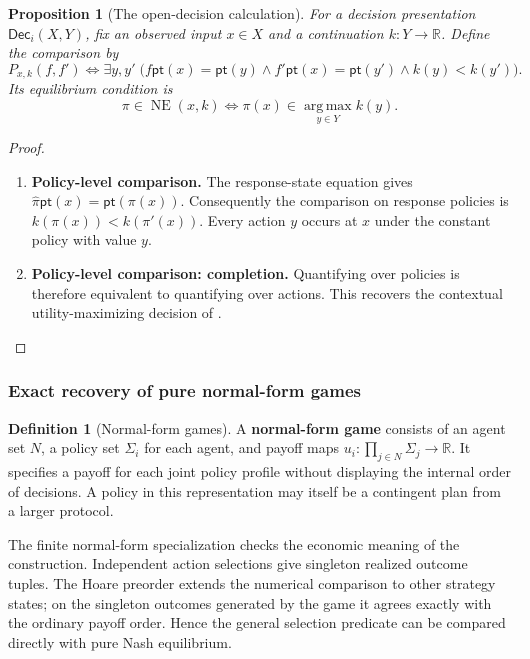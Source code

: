 \documentclass[11pt,a4paper]{article}
\numberwithin{equation}{section}
\newtheorem{proposition}[theorem]{Proposition}
\theoremstyle{definition}
\newtheorem{definition}[theorem]{Definition}
\theoremstyle{remark}
\theoremstyle{plain}
\begin{document}
\begin{proposition}[The open-decision calculation]
\label{prop:egt-open-decision}
For a decision presentation $\mathsf{Dec}_i(X,Y)$, fix an observed
input $x\in X$ and a continuation $k:Y\to\mathbb R$. Define
the comparison by
\[
 P_{x,k}(f,f')\iff\exists y,y'\;
 \bigl(f\mathsf{pt}(x)=\mathsf{pt}(y)\wedge
 f'\mathsf{pt}(x)=\mathsf{pt}(y')\wedge k(y)<k(y')\bigr).
\]
Its equilibrium condition is
\[
 \pi\in\operatorname{NE}(x,k)
 \iff\pi(x)\in\operatorname*{arg\,max}_{y\in Y}k(y).
\]
\end{proposition}
\begin{proof}
\leavevmode
\begin{enumerate}[label=\textup{(\arabic*)},leftmargin=*,itemsep=4pt,topsep=3pt]
  \item \textbf{Policy-level comparison.} The response-state equation gives
$\widehat\pi\mathsf{pt}(x)=\mathsf{pt}(\pi(x))$. Consequently the comparison on response policies is
$k(\pi(x))<k(\pi'(x))$. Every action $y$ occurs at $x$ under the constant
policy with value $y$.
  \item \textbf{Policy-level comparison: completion.} Quantifying over policies is therefore equivalent
to quantifying over actions. This recovers the contextual utility-maximizing
decision of \citet{GhaniEtAl2018}.
\end{enumerate}
\end{proof}

\subsubsection{Exact recovery of pure normal-form games}
\label{sec:egt-normal}

\begin{definition}[Normal-form games]
\label{def:egt-normal-form-game}
A \textbf{normal-form game} consists of an agent set $N$, a policy set
$\Sigma_i$ for each agent, and payoff maps
$u_i:\prod_{j\in N}\Sigma_j\to\mathbb R$. It specifies a payoff for each
joint policy profile without displaying the internal order of decisions.
A policy in this representation may itself be a contingent plan from a
larger protocol.
\end{definition}

The finite normal-form specialization checks the economic meaning of
the construction. Independent action selections give singleton realized
outcome tuples. The Hoare preorder extends the numerical comparison to
other strategy states; on the singleton outcomes generated by the game it
agrees exactly with the ordinary payoff order. Hence the general
selection predicate can be compared directly with pure Nash equilibrium.
\end{document}

